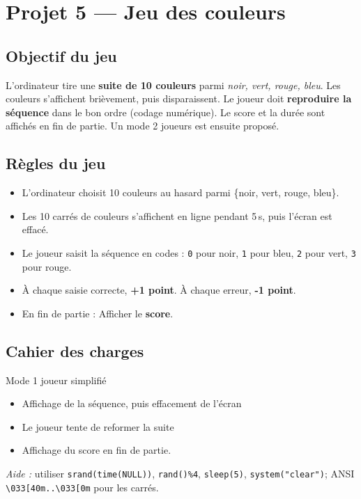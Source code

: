 \section{Projet 5 — Jeu des couleurs}
\setcounter{UPSTInumeroCahier des charges}{0}

\subsection*{Objectif du jeu}
L’ordinateur tire une \textbf{suite de 10 couleurs} parmi \textit{noir, vert, rouge, bleu}. Les couleurs s’affichent brièvement, puis disparaissent. Le joueur doit \textbf{reproduire la séquence} dans le bon ordre (codage numérique). Le score et la durée sont affichés en fin de partie. Un mode 2 joueurs est ensuite proposé.

\subsection*{Règles du jeu}
\begin{itemize}
  \item L'ordinateur choisit 10 couleurs au hasard parmi \{noir, vert, rouge, bleu\}. 
  \item Les 10 carrés de couleurs s'affichent en ligne pendant 5\,s, puis l’écran est effacé.
  \item Le joueur saisit la séquence en codes : \texttt{0} pour noir, \texttt{1} pour bleu, \texttt{2} pour vert, \texttt{3} pour rouge.
  \item À chaque saisie correcte, \textbf{+1 point}. À chaque erreur, \textbf{-1 point}.
  \item En fin de partie : Afficher le \textbf{score}.
\end{itemize}

\subsection*{Cahier des charges}
\begin{UPSTICahierDesCharges}{Mode 1 joueur simplifié}
\begin{itemize}
  \item Affichage de la séquence, puis effacement de l'écran
  \item Le joueur tente de reformer la suite
  \item Affichage du score en fin de partie.
\end{itemize}
\textit{Aide :} utiliser \texttt{srand(time(NULL))}, \texttt{rand()\%4}, \texttt{sleep(5)}, \texttt{system("clear")}; ANSI \texttt{\textbackslash033[40m..\textbackslash033[0m} pour les carrés.
\end{UPSTICahierDesCharges}

